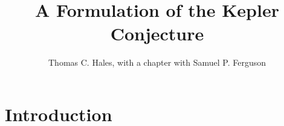 \documentclass[11pt]{amsart}
\title{A Formulation of the Kepler Conjecture}
\author{Thomas C. Hales, with a chapter with Samuel P. Ferguson}
\def\shortDCG#1{#1}
\def\shortDCG#1{}
\begin{document}
\begin{abstract}

\end{abstract}

\maketitle

\section*{Introduction}




\shortDCG{\section*{[TEMPLATE SECTION HEAD]}}

\shortDCG{[PRINTER: Please insert Sections~3, 4, 5, 6, 7 here.]}




\end{document}

